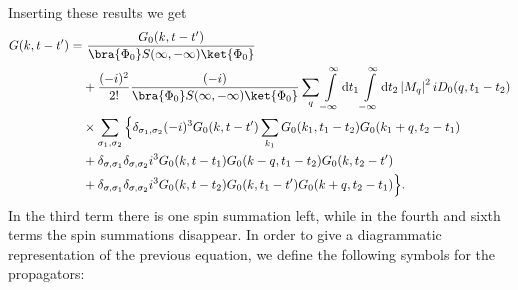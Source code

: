 Inserting these results we get
\[
\begin{aligned}
G(k,t-t') = &~\frac{G_0(k,t-t')}{\bra{\Phi_0}S(\infty,-\infty)\ket{\Phi_0}}\\
&+ \frac{(-i)^2}{2!}\frac{(-i)}{\bra{\Phi_0}S(\infty,-\infty)\ket{\Phi_0}}\sum_q \int\limits_{-\infty}^{\infty} \mathrm{d}t_1 \int\limits_{-\infty}^{\infty} \mathrm{d}t_2 \left|M_q\right|^2 i D_0(q,t_1-t_2) \\
&\times\sum_{\sigma_1,\sigma_2}\Big\{
\delta_{\sigma_1,\sigma_2}(-i)^3G_0(k,t-t')\sum_{k_1}G_0(k_1,t_1-t_2)G_0(k_1+q,t_2-t_1)\\
&+\delta_{\sigma,\sigma_1}\delta_{\sigma,\sigma_2}i^3G_0(k,t-t_1)G_0(k-q,t_1-t_2)G_0(k,t_2-t')\\
&+\delta_{\sigma,\sigma_1}\delta_{\sigma,\sigma_2}i^3 G_0(k,t-t_2)G_0(k,t_1-t')G_0(k+q,t_2-t_1)
\Big\}.
\end{aligned}
\]
In the third  term there is one spin summation left, while in the fourth and sixth terms the spin summations disappear. In order to give a diagrammatic representation of the previous equation, we define the following symbols for the propagators:

